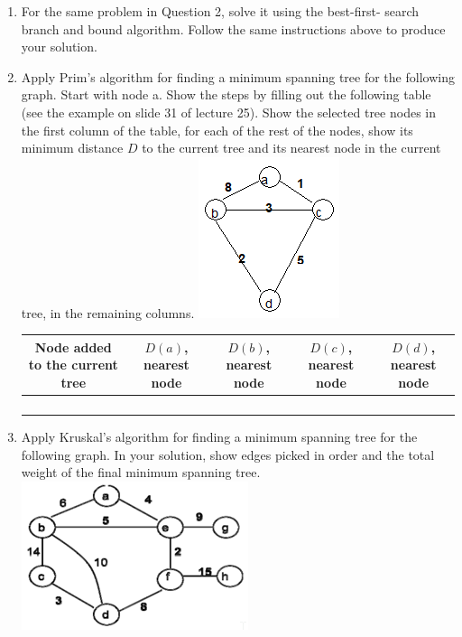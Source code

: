 \documentclass{article}
\begin{document}
\begin{enumerate}
    \item For the same problem in Question 2, solve it using the best-first-
    search branch and bound algorithm. Follow the same instructions above to 
    produce your solution.
    
    \item Apply Prim's algorithm for finding a minimum spanning tree for the 
    following graph. Start with node a. Show the steps by filling out the 
    following table (see the example on slide 31 of lecture 25). Show the 
    selected tree nodes in the first column of the table, for each of the rest 
    of the nodes, show its minimum distance $D$ to the current tree and its 
    nearest node in the current tree, in the remaining columns.\newline
    \includegraphics[scale=0.75]{p4_graph}\newline
    \begin{tabular}{|c |c |c |c |c|}
        \hline
        Node added to the current tree & $D(a)$, nearest node & $D(b)$, 
        nearest node & $D(c)$, nearest node & $D(d)$, nearest node\\
        \hline
        & & & &\\
        \hline
        & & & &\\
        \hline
        & & & &\\
        \hline
        & & & &\\
        \hline
    \end{tabular}
    
    \item Apply Kruskal’s algorithm for finding a minimum spanning tree for 
    the following graph. In your solution, show edges picked in order and the 
    total weight of the final minimum spanning tree.\newline
    \includegraphics[scale=0.75]{p5_graph}\newline


\end{enumerate}
\end{document}
